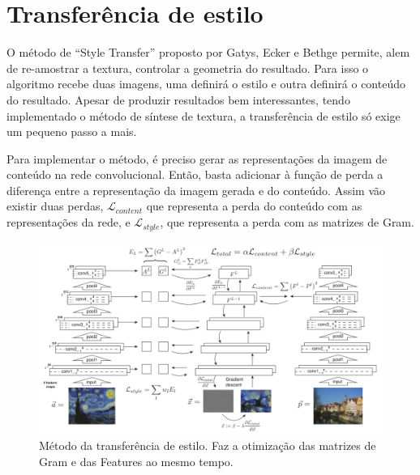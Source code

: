 \newpage
\section{Transferência de estilo} 

O método de ``Style Transfer'' proposto
por Gatys, Ecker e Bethge \cite{Gatys2016}
permite, alem de re-amostrar a textura,
controlar a geometria do resultado.
Para isso o algoritmo recebe duas imagens,
uma definirá o estilo
e outra definirá o conteúdo do resultado.
Apesar de produzir resultados bem interessantes,
tendo implementado o método de síntese de
textura, a transferência de estilo
só exige um pequeno passo a mais.


Para implementar o método, é preciso
gerar as representações da imagem de
conteúdo na rede convolucional.
Então, basta adicionar
à função de perda a diferença entre
a representação da imagem gerada e do
conteúdo. Assim vão existir duas perdas,
$\mathcal{L}_{content}$ que representa
a perda do conteúdo com as representações
da rede, e $\mathcal{L}_{style}$, que
representa a perda com as matrizes de Gram.




\begin{figure}[!ht]
	\centering
	\includegraphics[width=\linewidth]{files/assets/articles/gatys3.png}
	\caption{Método da transferência de estilo. Faz a otimização
	das matrizes de Gram e das Features ao mesmo tempo.}
	\label{img:preview}
\end{figure}




\fi